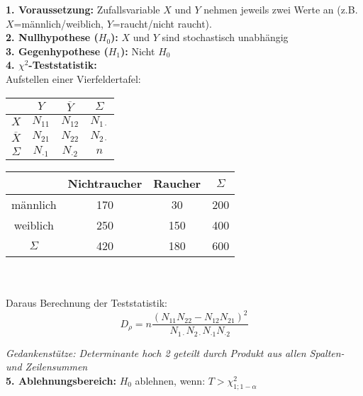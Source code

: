 \textbf{1. Voraussetzung:} Zufallsvariable \(X\) und \(Y\) nehmen jeweils zwei Werte an (z.B. \(X\)=männlich/weiblich, \(Y\)=raucht/nicht raucht).\\

\textbf{2. Nullhypothese (\(H_0\)):} \(X\) und \(Y\) sind stochastisch unabhängig\\

\textbf{3. Gegenhypothese (\(H_1\)):} Nicht \(H_0\)\\

\textbf{4. \(\chi^2\)-Teststatistik:}\\

Aufstellen einer Vierfeldertafel:\\

\begin{minipage}[c]{.4\textwidth}
    \centering
    \begin{tabular}{c|c|c|c}
                   & $Y$           & $\overline{Y}$ & $\Sigma$         \\ 
                   \hline
    $X$            & \(N_{11}\)    & \(N_{12}\)     & \(N_{1 \cdot} \) \\ 
    \hline
    $\overline{X}$ & \(N_{21}\)    & \(N_{22}\)     & \(N_{2\cdot} \)  \\ 
    \hline
    $\Sigma$       & $N_{\cdot 1}$ & $N_{\cdot 2}$  & $n$
    \end{tabular}
\end{minipage}
\begin{minipage}[c]{.6\textwidth}
    \centering
    \begin{tabular}{c|c|c|c}
             & Nichtraucher & Raucher & $\Sigma$ \\ 
    \hline
    männlich & 170          & 30      & 200 \\
    \hline
    weiblich & 250          & 150     & 400  \\
    \hline
    $\Sigma$ & 420          & 180     & 600
    \end{tabular}
\end{minipage}\\\\

Daraus Berechnung der Teststatistik:
\begin{equation*}
    D_{\rho} = n \frac{(N_{11}N_{22}-N_{12}N_{21})^2}{N_{1\cdot}N_{2\cdot}N_{\cdot1}N_{\cdot2}}
\end{equation*}

\emph{Gedankenstütze: Determinante hoch 2 geteilt durch Produkt aus allen Spalten- und Zeilensummen}\\

\textbf{5. Ablehnungsbereich:} \(H_0\) ablehnen, wenn:  \(T > \chi^2_{1;1-\alpha}\)\\